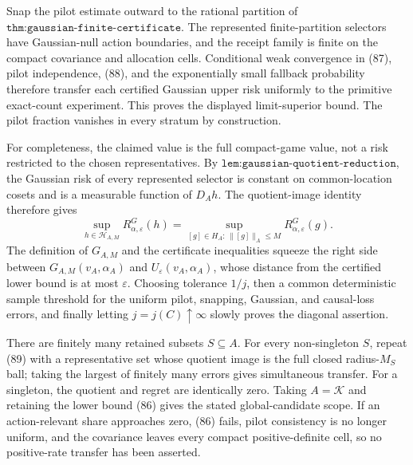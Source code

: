 Snap the pilot estimate outward to the rational partition of \(\texttt{thm:gaussian-finite-certificate}\).  The represented finite-partition selectors have Gaussian-null action boundaries, and the receipt family is finite on the compact covariance and allocation cells.  Conditional weak convergence in (87), pilot independence, (88), and the exponentially small fallback probability therefore transfer each certified Gaussian upper risk uniformly to the primitive exact-count experiment.  This proves the displayed limit-superior bound.  The pilot fraction vanishes in every stratum by construction.

For completeness, the claimed value is the full compact-game value, not a risk restricted to the chosen representatives.  By \(\texttt{lem:gaussian-quotient-reduction}\), the Gaussian risk of every represented selector is constant on common-location cosets and is a measurable function of \(D_Ah\).  The quotient-image identity therefore gives
\[
\sup_{h\in\mathscr H_{A,M}}R_{\alpha,\varepsilon}^G(h)
=\sup_{[g]\in H_A:\,\lVert[g]\rVert_A\leq M}
  R_{\alpha,\varepsilon}^G(g).                                  \tag{89}
\]
The definition of \(G_{A,M}\) and the certificate inequalities squeeze the right side between \(G_{A,M}(v_A,\alpha_A)\) and \(U_\varepsilon(v_A,\alpha_A)\), whose distance from the certified lower bound is at most \(\varepsilon\).  Choosing tolerance \(1/j\), then a common deterministic sample threshold for the uniform pilot, snapping, Gaussian, and causal-loss errors, and finally letting \(j=j(C)\uparrow\infty\) slowly proves the diagonal assertion.

There are finitely many retained subsets \(S\subseteq A\).  For every non-singleton \(S\), repeat (89) with a representative set whose quotient image is the full closed radius-\(M_S\) ball; taking the largest of finitely many errors gives simultaneous transfer.  For a singleton, the quotient and regret are identically zero.  Taking \(A=\mathcal K\) and retaining the lower bound (86) gives the stated global-candidate scope.  If an action-relevant share approaches zero, (86) fails, pilot consistency is no longer uniform, and the covariance leaves every compact positive-definite cell, so no positive-rate transfer has been asserted.